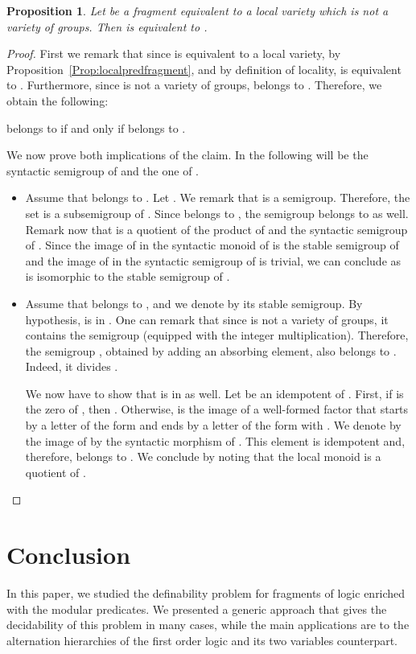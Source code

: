 \documentclass[submission,hidelink]{dmtcs-episciences}
\newtheorem{proposition}[theorem]{Proposition}
\begin{document}
\begin{proposition}\label{prop:QLV}
		Let  be a
		 fragment equivalent to a local variety  which is not a variety of groups.
		Then 
		is equivalent to .
\end{proposition}
\begin{proof}
First we remark that since  is equivalent to a local variety, by
Proposition~\ref{Prop:localpredfragment}, and by definition of locality,
  is equivalent to . Furthermore, since  is not a variety of groups,
  belongs to . Therefore, we obtain the following:
 

	  belongs to  if and only if
	 belongs to .

	We now prove both implications of the claim. In the following  will be the syntactic semigroup
	of  and  the one of .
	\begin{itemize}
	\item Assume that  belongs to .
	 Let . We remark that 
	is a semigroup. Therefore, the set  is a subsemigroup of . Since  belongs to ,
	the semigroup  belongs to  as well.
	 Remark now that  is a quotient of the product of  and the syntactic semigroup of
	. Since the image of  in the syntactic monoid of  is the stable semigroup of  and
	 the image of  in the syntactic
	semigroup of  is trivial, we can conclude as  is isomorphic to the
	stable semigroup of .

		\item Assume that  belongs to , and we denote by  its stable semigroup.
		By hypothesis,
		  is in . One can remark that since  is not a variety of groups, it contains the semigroup
		  (equipped with the integer multiplication).
		 Therefore, the semigroup , obtained by adding an
		absorbing element, also belongs to . Indeed, it divides .

		 We now have to show that  is in  as well.
		Let  be an idempotent of . First, if  is the zero of , then
		. Otherwise,  is the image of a well-formed factor  that starts by a letter of
		the form  and ends by a letter of the form  with .
		We denote by		 the image of  by the syntactic morphism of . This element
		is idempotent and, therefore, belongs to .
		We conclude by noting that
		the local monoid   is a quotient of .
	\end{itemize}
\end{proof}


\section{Conclusion}\label{Section:Concl}
In this paper, we studied the definability problem for fragments of logic enriched with the modular predicates.
We presented a generic approach that gives the decidability of this problem in many cases, while the main applications are to the alternation hierarchies of the first order logic and its two variables counterpart.
\end{document}
